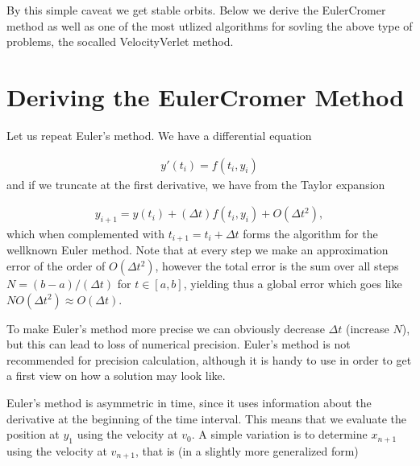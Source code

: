 \documentclass[letterpaper,10pt,english]{sphinxmanual}
\begin{document}
By this simple caveat we get stable orbits.
Below we derive the Euler\sphinxhyphen{}Cromer method as well as one of the most utlized algorithms for sovling the above type of problems, the so\sphinxhyphen{}called Velocity\sphinxhyphen{}Verlet method.


\section{Deriving the Euler\sphinxhyphen{}Cromer Method}
\label{\detokenize{chapter1:deriving-the-euler-cromer-method}}
Let us repeat Euler’s method.
We have a differential equation




\begin{equation*}
\begin{split}
\begin{equation}
y'(t_i)=f(t_i,y_i)   
\label{_auto34} \tag{37}
\end{equation}
\end{split}
\end{equation*}
and if we truncate at the first derivative, we have from the Taylor expansion




\begin{equation*}
\begin{split}
\begin{equation}
y_{i+1}=y(t_i) + (\Delta t) f(t_i,y_i) + O(\Delta t^2), \label{eq:euler} \tag{38}
\end{equation}
\end{split}
\end{equation*}
which when complemented with \(t_{i+1}=t_i+\Delta t\) forms
the algorithm for the well\sphinxhyphen{}known Euler method.
Note that at every step we make an approximation error
of the order of \(O(\Delta t^2)\), however the total error is the sum over all
steps \(N=(b-a)/(\Delta t)\) for \(t\in [a,b]\), yielding thus a global error which goes like
\(NO(\Delta t^2)\approx O(\Delta t)\).

To make Euler’s method more precise we can obviously
decrease \(\Delta t\) (increase \(N\)), but this can lead to loss of numerical precision.
Euler’s method is not recommended for precision calculation,
although it is handy to use in order to get a first
view on how a solution may look like.

Euler’s method is asymmetric in time, since it uses information about the derivative at the beginning
of the time interval. This means that we evaluate the position at \(y_1\) using the velocity
at \(v_0\). A simple variation is to determine \(x_{n+1}\) using the velocity at
\(v_{n+1}\), that is (in a slightly more generalized form)
\end{document}
